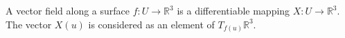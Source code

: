 A vector field along a surface $f: U \to \mathbb{R}^3$ is a differentiable mapping $X: U \to \mathbb{R}^3$. The vector $X(u)$ is considered as an element of $T_{f(u)}\mathbb{R}^3$.